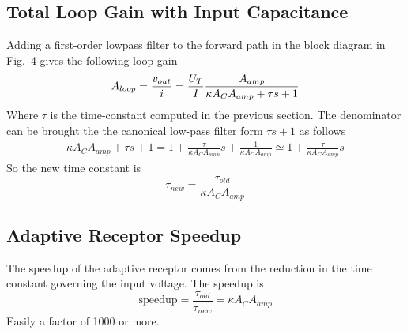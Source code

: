 \subsection{Total Loop Gain with Input Capacitance}
Adding a first-order lowpass filter to the forward path in the block diagram in Fig.~4 gives the following loop gain
\begin{equation*}
    A_{loop} = \frac{v_{out}}{i} =\frac{U_T}{I} \frac{A_{amp}}{\kappa A_C A_{amp}+\tau s + 1} \\
\end{equation*}
Where \(\tau\) is the time-constant computed in the previous section.
The denominator can be brought the the canonical low-pass filter form \(\tau s + 1\) as follows
\begin{align*}
    \kappa A_C A_{amp} + \tau s + 1 = 1 + \frac{\tau}{\kappa A_C A_{amp}}s + \frac{1}{\kappa A_C A_{amp}} \simeq 1 + \frac{\tau}{\kappa A_C A_{amp}}s
\end{align*}
So the new time constant is
\begin{equation*}
    \tau_{new} = \frac{\tau_{old}}{\kappa A_C A_{amp}}
\end{equation*}

\subsection{Adaptive Receptor Speedup}
The speedup of the adaptive receptor comes from the reduction in the time constant governing the input voltage. The speedup is
\begin{equation*}
    \mathrm{speedup} = \frac{\tau_{old}}{\tau_{new}} = \kappa A_C A_{amp}
\end{equation*}
Easily a factor of 1000 or more.



